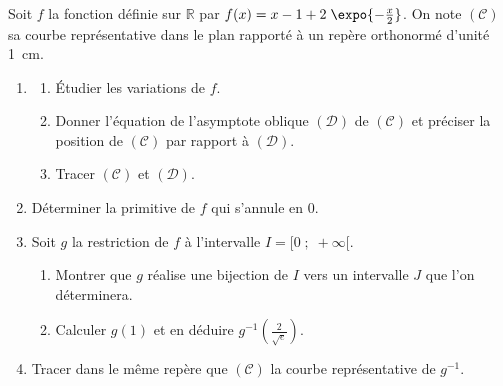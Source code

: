 \begin{exo}
\label{exo:pb x moins un}
Soit $f$ la fonction d\'efinie sur $\mathbb{R}$ par $f(x) = x - 1 + 2 \; \expo{-\frac{x}{2}}$.
On note $(\mathscr{C})$ sa courbe repr\'esentative dans le plan rapport\'e \`a un
rep\`ere orthonorm\'e \Oij{} d'unit\'e 1~cm.
\begin{enumerate}
\item \begin{enumerate}
      \item \'Etudier les variations de $f$.
      \item Donner l'\'equation de l'asymptote oblique $(\mathcal{D})$ de $(\mathscr{C})$ et
      pr\'eciser la position de $(\mathscr{C})$ par rapport \`a $(\mathcal{D})$.
      \item Tracer $(\mathscr{C})$ et $(\mathcal{D})$.
      \end{enumerate}
\item D\'eterminer la primitive de $f$ qui s'annule en $0$.
\item Soit $g$ la restriction de $f$ \`a l'intervalle $I = [0 \; ; \; +\infty[$.
      \begin{enumerate}
      \item Montrer que $g$ r\'ealise une bijection de $I$ vers un intervalle $J$ que l'on d\'eterminera.
      \item Calculer $g(1)$ et en d\'eduire $g^{-1} \left( \frac{2}{\sqrt{e}} \right) $.
      \end{enumerate}
\item Tracer dans le m\^eme rep\`ere que $(\mathscr{C})$ la courbe repr\'esentative de $g^{-1}$.
\end{enumerate}
\end{exo}

